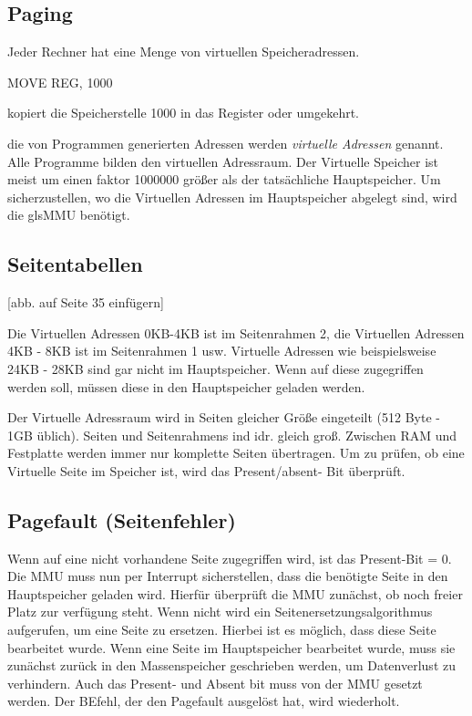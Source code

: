 \subsection{Paging}

Jeder Rechner hat eine Menge von virtuellen Speicheradressen. 

MOVE REG, 1000

kopiert die Speicherstelle 1000 in das Register oder umgekehrt.

die von Programmen generierten Adressen werden \textit{virtuelle Adressen} genannt. Alle Programme bilden den virtuellen Adressraum. Der Virtuelle Speicher ist meist um einen faktor 1000000 größer als der tatsächliche Hauptspeicher. Um sicherzustellen, wo die Virtuellen Adressen im Hauptspeicher abgelegt sind, wird die gls{MMU} benötigt.

\subsection{Seitentabellen}

[abb. auf Seite 35 einfügern]

Die Virtuellen Adressen 0KB-4KB ist im Seitenrahmen 2, die Virtuellen Adressen 4KB - 8KB ist im Seitenrahmen 1 usw. Virtuelle Adressen wie beispielsweise 24KB - 28KB sind gar nicht im Hauptspeicher. Wenn auf diese zugegriffen werden soll, müssen diese in den Hauptspeicher geladen werden.

Der Virtuelle Adressraum wird in Seiten gleicher Größe eingeteilt (512 Byte - 1GB üblich). Seiten und Seitenrahmens ind idr. gleich groß. Zwischen RAM und Festplatte werden immer nur komplette Seiten übertragen. Um zu prüfen, ob eine Virtuelle Seite im Speicher ist, wird das Present/absent- Bit überprüft.

\subsection{Pagefault (Seitenfehler)}

Wenn auf eine nicht vorhandene Seite zugegriffen wird, ist das Present-Bit = 0. Die MMU muss nun per Interrupt sicherstellen, dass die benötigte Seite in den Hauptspeicher geladen wird. Hierfür überprüft die MMU zunächst, ob noch freier Platz zur verfügung steht. Wenn nicht wird ein Seitenersetz\-ungsalgorithmus aufgerufen, um eine Seite zu ersetzen. Hierbei ist es möglich, dass diese Seite bearbeitet wurde. Wenn eine Seite im Hauptspeicher bearbeitet wurde, muss sie zunächst zurück in den Massenspeicher geschrieben werden, um Datenverlust zu verhindern. Auch das Present- und Absent bit muss von der MMU gesetzt werden. Der BEfehl, der den Pagefault ausgelöst hat, wird wiederholt.

